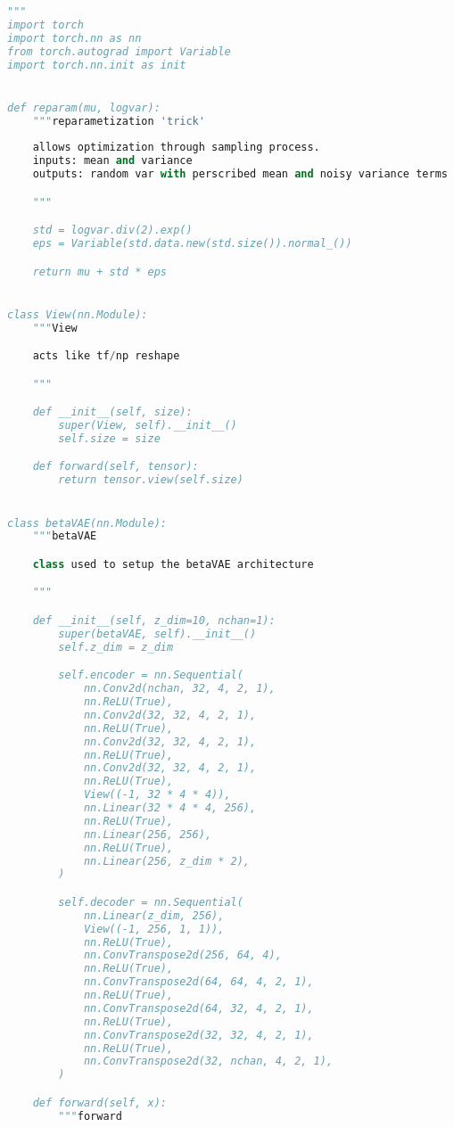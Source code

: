 \documentclass[justified,nobib]{tufte-handout}
\begin{document}
\begin{fullwidth}
\begin{lstlisting}[language=Python]
"""
import torch
import torch.nn as nn
from torch.autograd import Variable
import torch.nn.init as init


def reparam(mu, logvar):
    """reparametization 'trick'
    
    allows optimization through sampling process.
    inputs: mean and variance
    outputs: random var with perscribed mean and noisy variance terms

    """

    std = logvar.div(2).exp()
    eps = Variable(std.data.new(std.size()).normal_())

    return mu + std * eps


class View(nn.Module):
    """View

    acts like tf/np reshape

    """

    def __init__(self, size):
        super(View, self).__init__()
        self.size = size

    def forward(self, tensor):
        return tensor.view(self.size)


class betaVAE(nn.Module):
    """betaVAE

    class used to setup the betaVAE architecture 

    """

    def __init__(self, z_dim=10, nchan=1):
        super(betaVAE, self).__init__()
        self.z_dim = z_dim

        self.encoder = nn.Sequential(
            nn.Conv2d(nchan, 32, 4, 2, 1),
            nn.ReLU(True),
            nn.Conv2d(32, 32, 4, 2, 1),
            nn.ReLU(True),
            nn.Conv2d(32, 32, 4, 2, 1),
            nn.ReLU(True),
            nn.Conv2d(32, 32, 4, 2, 1),
            nn.ReLU(True),
            View((-1, 32 * 4 * 4)),
            nn.Linear(32 * 4 * 4, 256),
            nn.ReLU(True),
            nn.Linear(256, 256),
            nn.ReLU(True),
            nn.Linear(256, z_dim * 2),
        )

        self.decoder = nn.Sequential(
            nn.Linear(z_dim, 256),
            View((-1, 256, 1, 1)),
            nn.ReLU(True),
            nn.ConvTranspose2d(256, 64, 4),
            nn.ReLU(True),
            nn.ConvTranspose2d(64, 64, 4, 2, 1),
            nn.ReLU(True),
            nn.ConvTranspose2d(64, 32, 4, 2, 1),
            nn.ReLU(True),
            nn.ConvTranspose2d(32, 32, 4, 2, 1),
            nn.ReLU(True),
            nn.ConvTranspose2d(32, nchan, 4, 2, 1),
        )

    def forward(self, x):
        """forward


\end{lstlisting}
\end{fullwidth}
\end{document}
